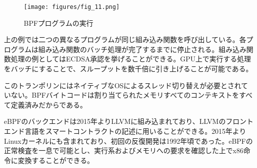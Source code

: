 \documentclass[12pt]{ltjsarticle}
\begin{document}
\begin{figure}
  \begin{center}
    \centering
    \texttt{[image: figures/fig\_11.png]}
    \caption[図11]{BPFプログラムの実行\label{fig_11}}
  \end{center}
  \end{figure}

上の例では二つの異なるプログラムが同じ組み込み関数を呼び出している。各プログラムは組み込み関数のバッチ処理が完了するまでに停止される。組み込み関数処理の例としてはECDSA承認を挙げることができる。GPU上で実行する処理をバッチにすることで、スループットを数千倍に引き上げることが可能である。

このトランポリンにはネイティブなOSによるスレッド切り替えが必要とされていない。BPFバイトコードは割り当てられたメモリすべてのコンテキストをすべて定義済みだからである。

eBPFのバックエンドは2015年よりLLVMに組み込まれており、LLVMのフロントエンド言語をスマートコントラクトの記述に用いることができる。2015年よりLinuxカーネルにも含まれており、初回の反復開発は1992年頃であった。eBPFの正常検査を一息で可能とし、実行系およびメモリへの要求を確認した上でx86命令に変換することができる。



\end{document}
